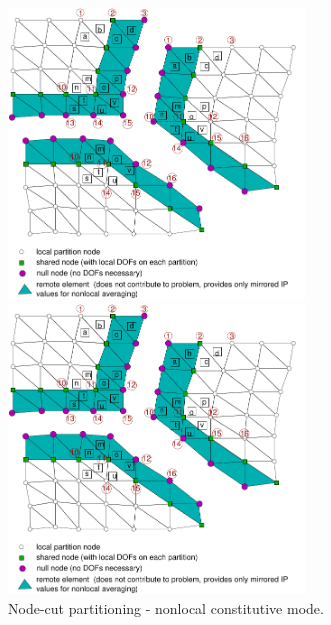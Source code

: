 \documentclass[a4paper]{article}
\begin{document}
\begin{figure}[htb]
\begin{htmlonly}
  \centerline{\includegraphics[width=0.7\textwidth]{nodecutnonloc1}}
\end{htmlonly}
\centerline{\includegraphics[width=0.7\textwidth]{nodecutnonloc1}}
\caption{Node-cut partitioning - nonlocal constitutive mode.}
\label{nodecut-nlm}
\end{figure}

\end{document}
